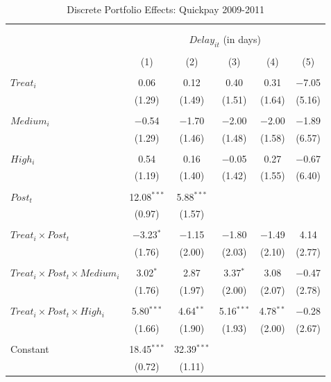 \documentclass[
]{article}
\begin{document}
\begin{table}[H] \centering 
  \caption{Discrete Portfolio Effects: Quickpay 2009-2011} 
  \label{} 
\small 
\begin{tabular}{@{\extracolsep{-2pt}}lccccc} 
\\[-1.8ex]\hline 
\hline \\[-1.8ex] 
\\[-1.8ex] & \multicolumn{5}{c}{$Delay_{it}$ (in days)} \\ 
\\[-1.8ex] & (1) & (2) & (3) & (4) & (5)\\ 
\hline \\[-1.8ex] 
 $Treat_i$ & 0.06 & 0.12 & 0.40 & 0.31 & $-$7.05 \\ 
  & (1.29) & (1.49) & (1.51) & (1.64) & (5.16) \\ 
  & & & & & \\ 
 $Medium_i$ & $-$0.54 & $-$1.70 & $-$2.00 & $-$2.00 & $-$1.89 \\ 
  & (1.29) & (1.46) & (1.48) & (1.58) & (6.57) \\ 
  & & & & & \\ 
 $High_i$ & 0.54 & 0.16 & $-$0.05 & 0.27 & $-$0.67 \\ 
  & (1.19) & (1.40) & (1.42) & (1.55) & (6.40) \\ 
  & & & & & \\ 
 $Post_t$ & 12.08$^{***}$ & 5.88$^{***}$ &  &  &  \\ 
  & (0.97) & (1.57) &  &  &  \\ 
  & & & & & \\ 
 $Treat_i \times Post_t$ & $-$3.23$^{*}$ & $-$1.15 & $-$1.80 & $-$1.49 & 4.14 \\ 
  & (1.76) & (2.00) & (2.03) & (2.10) & (2.77) \\ 
  & & & & & \\ 
 $Treat_i \times Post_t \times Medium_i$ & 3.02$^{*}$ & 2.87 & 3.37$^{*}$ & 3.08 & $-$0.47 \\ 
  & (1.76) & (1.97) & (2.00) & (2.07) & (2.78) \\ 
  & & & & & \\ 
 $Treat_i \times Post_t \times High_i$ & 5.80$^{***}$ & 4.64$^{**}$ & 5.16$^{***}$ & 4.78$^{**}$ & $-$0.28 \\ 
  & (1.66) & (1.90) & (1.93) & (2.00) & (2.67) \\ 
  & & & & & \\ 
 Constant & 18.45$^{***}$ & 32.39$^{***}$ &  &  &  \\ 
  & (0.72) & (1.11) &  &  &  \\ 

\end{tabular}
\end{table}
\end{document}
